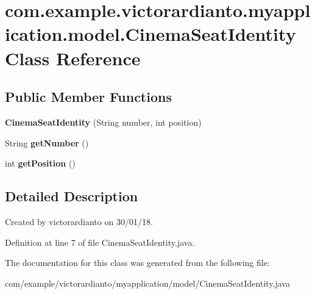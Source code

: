 \hypertarget{classcom_1_1example_1_1victorardianto_1_1myapplication_1_1model_1_1_cinema_seat_identity}{}\section{com.\+example.\+victorardianto.\+myapplication.\+model.\+Cinema\+Seat\+Identity Class Reference}
\label{classcom_1_1example_1_1victorardianto_1_1myapplication_1_1model_1_1_cinema_seat_identity}
\subsection*{Public Member Functions}
\begin{DoxyCompactItemize}
\item 
\mbox{\label{classcom_1_1example_1_1victorardianto_1_1myapplication_1_1model_1_1_cinema_seat_identity_ae49dd73693482dd50c11ca8a1a55e343}} 
{\bfseries Cinema\+Seat\+Identity} (String number, int position)
\item 
\mbox{\label{classcom_1_1example_1_1victorardianto_1_1myapplication_1_1model_1_1_cinema_seat_identity_ad8374b68303e554835471cd728d1b43a}} 
String {\bfseries get\+Number} ()
\item 
\mbox{\label{classcom_1_1example_1_1victorardianto_1_1myapplication_1_1model_1_1_cinema_seat_identity_ab0171e74db066d10e467dd2dbeda1e7f}} 
int {\bfseries get\+Position} ()
\end{DoxyCompactItemize}


\subsection{Detailed Description}
Created by victorardianto on 30/01/18. 

Definition at line 7 of file Cinema\+Seat\+Identity.\+java.



The documentation for this class was generated from the following file\+:\begin{DoxyCompactItemize}
\item 
com/example/victorardianto/myapplication/model/Cinema\+Seat\+Identity.\+java\end{DoxyCompactItemize}
